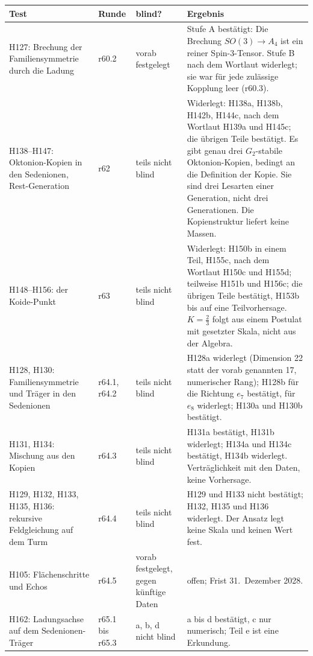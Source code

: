 \begin{center}
\small
\begin{tabular}{@{}p{.21\linewidth}p{.09\linewidth}p{.15\linewidth}p{.45\linewidth}@{}}
\hline
\textbf{Test} & \textbf{Runde} & \textbf{blind?} & \textbf{Ergebnis}\\
\hline
\raggedright H127: Brechung der Familiensymmetrie durch die Ladung & r60.2 & \raggedright vorab festgelegt & \raggedright Stufe A bestätigt: Die Brechung \(SO(3)\to A_4\) ist ein reiner Spin-3-Tensor. Stufe B nach dem Wortlaut widerlegt; sie war für jede zulässige Kopplung leer (r60.3).\tabularnewline
\raggedright H138--H147: Oktonion-Kopien in den Sedenionen, Rest-Generation & r62 & \raggedright teils nicht blind & \raggedright Widerlegt: H138a, H138b, H142b, H144c, nach dem Wortlaut H139a und H145c; die übrigen Teile bestätigt. Es gibt genau drei \(G_2\)-stabile Oktonion-Kopien, bedingt an die Definition der Kopie. Sie sind drei Lesarten einer Generation, nicht drei Generationen. Die Kopienstruktur liefert keine Massen.\tabularnewline
\raggedright H148--H156: der Koide-Punkt & r63 & \raggedright teils nicht blind & \raggedright Widerlegt: H150b in einem Teil, H155c, nach dem Wortlaut H150c und H155d; teilweise H151b und H156c; die übrigen Teile bestätigt, H153b bis auf eine Teilvorhersage. \(K=\tfrac23\) folgt aus einem Postulat mit gesetzter Skala, nicht aus der Algebra.\tabularnewline
\raggedright H128, H130: Familiensymmetrie und Träger in den Sedenionen & r64.1, r64.2 & \raggedright teils nicht blind & \raggedright H128a widerlegt (Dimension 22 statt der vorab genannten 17, numerischer Rang); H128b für die Richtung \(e_7\) bestätigt, für \(e_8\) widerlegt; H130a und H130b bestätigt.\tabularnewline
\raggedright H131, H134: Mischung aus den Kopien & r64.3 & \raggedright teils nicht blind & \raggedright H131a bestätigt, H131b widerlegt; H134a und H134c bestätigt, H134b widerlegt. Verträglichkeit mit den Daten, keine Vorhersage.\tabularnewline
\raggedright H129, H132, H133, H135, H136: rekursive Feldgleichung auf dem Turm & r64.4 & \raggedright teils nicht blind & \raggedright H129 und H133 nicht bestätigt; H132, H135 und H136 widerlegt. Der Ansatz legt keine Skala und keinen Wert fest.\tabularnewline
\raggedright H105: Flächenschritte und Echos & r64.5 & \raggedright vorab festgelegt, gegen künftige Daten & \raggedright offen; Frist 31.~Dezember 2028.\tabularnewline
\raggedright H162: Ladungsachse auf dem Sedenionen-Träger & r65.1 bis r65.3 & \raggedright a, b, d nicht blind & \raggedright a bis d bestätigt, c nur numerisch; Teil e ist eine Erkundung.\tabularnewline
\hline
\end{tabular}
\end{center}

